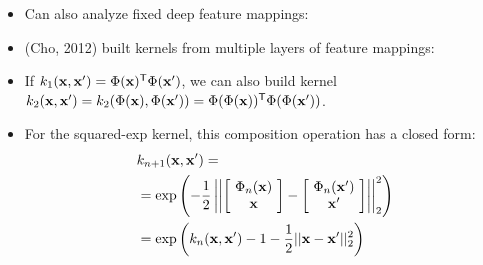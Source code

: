\documentclass[landscape,a0b,final,a4resizeable]{include/a0poster}
\begin{document}
\begin{poster}
\begin{multicols}{3}
\begin{minipage}[c]{0.6\columnwidth}

\begin{itemize}
\item Can also analyze fixed deep feature mappings:
\item {\color{mydarkblue} (Cho, 2012) } built kernels from multiple layers of feature mappings:
\item If ${k_1({\bf{x}}, {\bf{x}}') = \Phi({\bf{x}}) {^\mathsf{T}} \Phi({\bf{x}}')}$, we can also build kernel ${k_2({\bf{x}}, {\bf{x}}') = k_2(\Phi({\bf{x}}), \Phi({\bf{x}}')) = \Phi(\Phi({\bf{x}})) {^\mathsf{T}} \Phi(\Phi({\bf{x}}'))}$.
%

\item For the squared-exp kernel, this composition operation has a closed form:%
%
%
%
%
%
\begin{align*}
& k_{n+1}({\bf{x}}, {\bf{x}}') = \nonumber \\
& = \exp \left( -\frac{1}{2} \left|\left| \left[ \! \begin{array}{c} \Phi_n({\bf{x}}) \\ {\bf{x}} \end{array} \! \right]  - \left[ \! \begin{array}{c} \Phi_n({\bf{x}}') \\ {\bf{x}}' \end{array} \! \right] \right| \right|_2^2 \right) \nonumber \\
& = \exp \left( k_n({\bf{x}}, {\bf{x}}') - 1 -\frac{1}{2} || {\bf{x}} - {\bf{x}}' ||_2^2 \right)
\end{align*}


\end{itemize}
\end{minipage}
\end{multicols}
\end{poster}
\end{document}
